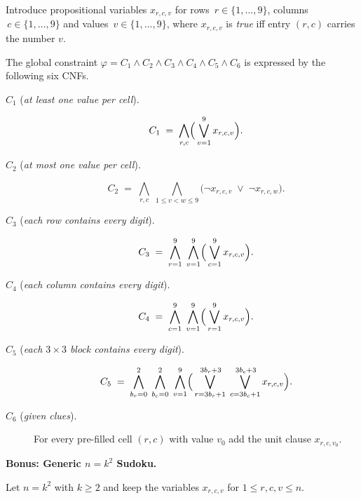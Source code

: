 \documentclass{article}
\theoremstyle{theorem}
\theoremstyle{definition}
\theoremstyle{remark}
\begin{document}
Introduce propositional variables $x_{r,c,v}$ for rows $\,r\in\{1,\dots,9\}$,
columns $\,c\in\{1,\dots,9\}$ and values $\,v\in\{1,\dots,9\}$, where
$x_{r,c,v}$ is \emph{true} iff entry $(r,c)$ carries the number $v$.

The global constraint
$\varphi = C_1 \land C_2 \land C_3 \land C_4 \land C_5 \land C_6$
is expressed by the following six CNFs.

\begin{description}
  \item[$C_1$ (\emph{at least one value per cell}).]
        \[
          C_1 \;=\; \bigwedge_{r,c}\Bigl(\,\bigvee_{v=1}^{9} x_{r,c,v}\Bigr).
        \]

  \item[$C_2$ (\emph{at most one value per cell}).]
        \[
          C_2 \;=\; \bigwedge_{r,c}\;
                     \bigwedge_{1 \le v < w \le 9}
                     \bigl(\neg x_{r,c,v}\;\lor\;\neg x_{r,c,w}\bigr).
        \]

  \item[$C_3$ (\emph{each row contains every digit}).]
        \[
          C_3 \;=\; \bigwedge_{r=1}^{9}\;
                     \bigwedge_{v=1}^{9}
                     \Bigl(\,\bigvee_{c=1}^{9} x_{r,c,v}\Bigr).
        \]

  \item[$C_4$ (\emph{each column contains every digit}).]
        \[
          C_4 \;=\; \bigwedge_{c=1}^{9}\;
                     \bigwedge_{v=1}^{9}
                     \Bigl(\,\bigvee_{r=1}^{9} x_{r,c,v}\Bigr).
        \]

  \item[$C_5$ (\emph{each $3\times3$ block contains every digit}).]
        \[
          C_5 \;=\; \bigwedge_{b_r = 0}^{2}\;
                     \bigwedge_{b_c = 0}^{2}\;
                     \bigwedge_{v=1}^{9}
                     \Bigl(\,
                        \bigvee_{r = 3b_r + 1}^{\,3b_r + 3}
                        \;\bigvee_{c = 3b_c + 1}^{\,3b_c + 3}
                        x_{r,c,v}\Bigr).
        \]

  \item[$C_6$ (\emph{given clues}).]
        For every pre-filled cell $(r,c)$ with value $v_0$ add the unit clause $x_{r,c,v_0}$.
\end{description}


\medskip
\medskip
\textbf{Bonus: Generic $n=k^{2}$ Sudoku.}

Let $n=k^{2}$ with $k\ge 2$ and keep the variables
$x_{r,c,v}$ for $1\le r,c,v\le n$.
\end{document}
